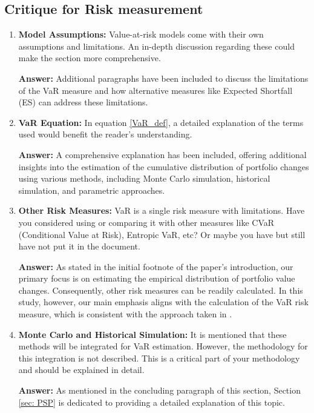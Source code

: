 \subsection{Critique for Risk measurement}
\begin{enumerate}
\item \textbf{Model Assumptions:} Value-at-risk models come with their own assumptions and limitations. An in-depth discussion regarding these could make the section more comprehensive.

\textbf{Answer:}
Additional paragraphs have been included to discuss the limitations of the VaR measure and how alternative measures like Expected Shortfall (ES) can address these limitations.

\item \textbf{VaR Equation:} In equation \eqref{VaR_def}, a detailed explanation of the terms used would benefit the reader's understanding.

\textbf{Answer:}
A comprehensive explanation has been included, offering additional insights into the estimation of the cumulative distribution of portfolio changes using various methods, including Monte Carlo simulation, historical simulation, and parametric approaches.

\item \textbf{Other Risk Measures:} VaR is a single risk measure with limitations. Have you considered using or comparing it with other measures like CVaR (Conditional Value at Risk), Entropic VaR, etc? Or maybe you have but still have not put it in the document.

\textbf{Answer:}
As stated in the initial footnote of the paper's introduction, our primary focus is on estimating the empirical distribution of portfolio value changes. Consequently, other risk measures can be readily calculated. In this study, however, our main emphasis aligns with the calculation of the VaR risk measure, which is consistent with the approach taken in \cite{zamani2022pathwise}.

\item \textbf{Monte Carlo and Historical Simulation:} It is mentioned that these methods will be integrated for VaR estimation. However, the methodology for this integration is not described. This is a critical part of your methodology and should be explained in detail.

\textbf{Answer:}
As mentioned in the concluding paragraph of this section, Section \ref{sec: PSP} is dedicated to providing a detailed explanation of this topic.

\end{enumerate}


